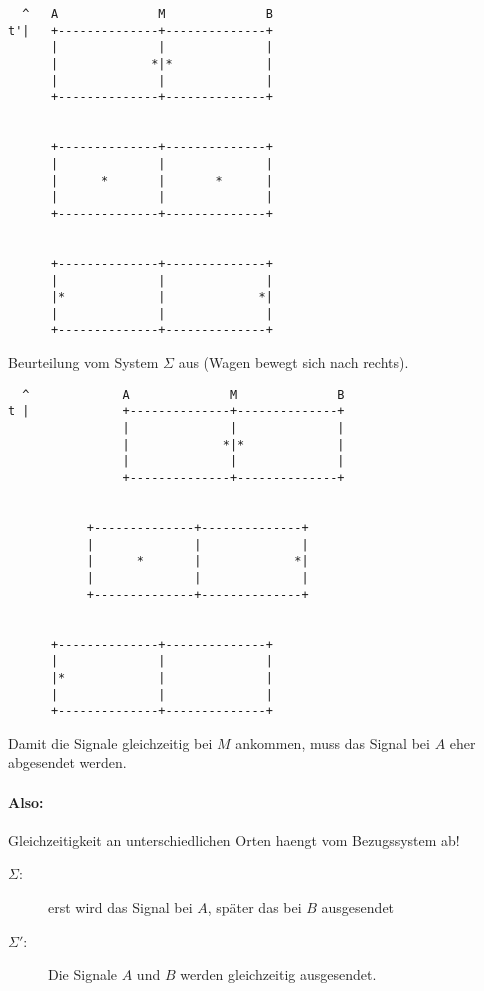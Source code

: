 \documentclass{scrartcl}
\begin{document}
\begin{verbatim}
  ^   A              M              B
t'|   +--------------+--------------+
      |              |              |
      |             *|*             |
      |              |              |
      +--------------+--------------+


      +--------------+--------------+
      |              |              |
      |      *       |       *      |
      |              |              |
      +--------------+--------------+


      +--------------+--------------+
      |              |              |
      |*             |             *|
      |              |              |
      +--------------+--------------+
\end{verbatim}


Beurteilung vom System $\Sigma$ aus (Wagen bewegt sich nach rechts).

\begin{verbatim}
  ^             A              M              B
t |             +--------------+--------------+
                |              |              |
                |             *|*             |
                |              |              |
                +--------------+--------------+


           +--------------+--------------+
           |              |              |
           |      *       |             *|
           |              |              |
           +--------------+--------------+


      +--------------+--------------+
      |              |              |
      |*             |              |
      |              |              |
      +--------------+--------------+
\end{verbatim}


Damit die Signale gleichzeitig bei $M$ ankommen, muss das Signal bei
$A$ eher abgesendet werden.

\paragraph{Also:} Gleichzeitigkeit an unterschiedlichen Orten haengt
vom Bezugssystem ab!

\begin{description}
\item[$\Sigma$:] erst wird das Signal bei $A$, sp\"ater das bei $B$
  ausgesendet
\item[$\Sigma'$:] Die Signale $A$ und $B$ werden gleichzeitig
  ausgesendet.
\end{description}
\end{document}
